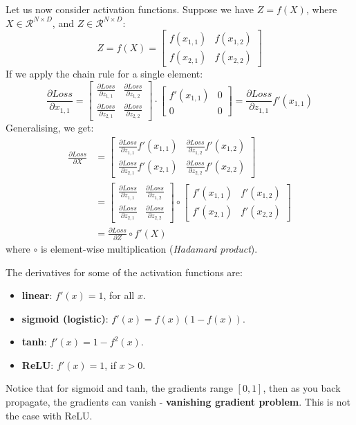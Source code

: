 \documentclass[11pt]{article}
\begin{document}
Let us now consider activation functions.
Suppose we have $Z = f(X)$, where $X \in \mathcal{R}^{N \times D}$, and $Z \in \mathcal{R}^{N \times D}$:
\[
  Z = f(X) = \begin{bmatrix} f(x_{1, 1}) & f(x_{1, 2}) \\  f(x_{2, 1}) & f(x_{2, 2})\end{bmatrix}
\]
If we apply the chain rule for a single element:
\[
 \frac{\partial Loss}{\partial x_{1,1}} =
  \begin{bmatrix}
  \frac{\partial Loss}{\partial z_{1,1}} & \frac{\partial Loss}{\partial z_{1,2}} \\
  \frac{\partial Loss}{\partial z_{2,1}} & \frac{\partial Loss}{\partial z_{2,2}}
  \end{bmatrix} \cdot
  \begin{bmatrix}
  f'(x_{1,1}) & 0 \\
  0 & 0
  \end{bmatrix}
  = \frac{\partial Loss}{\partial z_{1,1}} f'(x_{1,1}) 
\]
Generalising, we get:
\begin{align*}
  \frac{\partial Loss}{\partial X} &=
  \begin{bmatrix}
  \frac{\partial Loss}{\partial z_{1,1}} f'(x_{1,1}) & \frac{\partial Loss}{\partial z_{1,2}} f'(x_{1,2}) \\
  \frac{\partial Loss}{\partial z_{2,1}} f'(x_{2,1}) & \frac{\partial Loss}{\partial z_{2,2}} f'(x_{2,2})
  \end{bmatrix}
  \\
  &=
  \begin{bmatrix}
  \frac{\partial Loss}{\partial z_{1,1}} & \frac{\partial Loss}{\partial z_{1,2}} \\
  \frac{\partial Loss}{\partial z_{2,1}} & \frac{\partial Loss}{\partial z_{2,2}}
  \end{bmatrix} \circ
  \begin{bmatrix}
  f'(x_{1,1}) & f'(x_{1,2}) \\
  f'(x_{2,1}) & f'(x_{2,2})
  \end{bmatrix}
  \\
  &=
  \frac{\partial Loss}{\partial Z} \circ f'(X)
\end{align*}
where $\circ$ is element-wise multiplication (\textit{Hadamard product}).

The derivatives for some of the activation functions are:
\begin{itemize}
  \item \textbf{linear}: $f'(x) = 1$, for all $x$.
  \item \textbf{sigmoid (logistic)}: $f'(x) = f(x)(1-f(x))$.
  \item \textbf{tanh}: $f'(x) = 1-f^2(x)$.
  \item \textbf{ReLU}: $f'(x) = 1$, if $x > 0$.
\end{itemize}
Notice that for sigmoid and tanh, the gradients range $[0, 1]$, then as you back propagate, the gradients can vanish - \textbf{vanishing gradient problem}.
This is not the case with ReLU.
\end{document}
